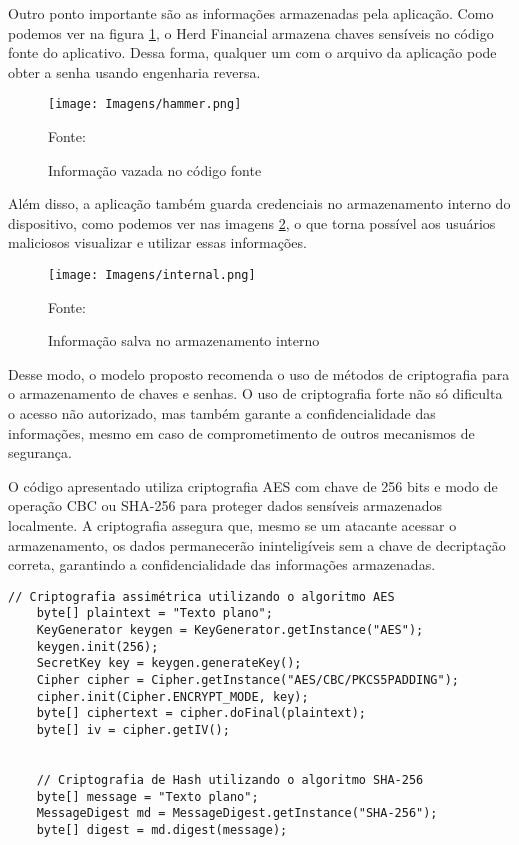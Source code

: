     Outro ponto importante são as informações armazenadas pela aplicação. Como podemos ver na figura \ref{chave}, o Herd Financial armazena chaves sensíveis no código fonte do aplicativo. Dessa forma, qualquer um com o arquivo da aplicação pode obter a senha usando engenharia reversa.

    \begin{figure}[H]
    \centering 
    \texttt{[image: Imagens/hammer.png]} 
    \caption{Informação vazada no código fonte}
    Fonte: 
    \label{chave}
    \end{figure}

    Além disso, a aplicação também guarda credenciais no armazenamento interno do dispositivo, como podemos ver nas imagens \ref{internal}, o que torna possível aos usuários maliciosos visualizar e utilizar essas informações. 
    
    \begin{figure}[H]
    \centering 
    \texttt{[image: Imagens/internal.png]} 
    \caption{Informação salva no armazenamento interno}
    Fonte: 
    \label{internal}
    \end{figure}


    Desse modo, o modelo proposto recomenda o uso de métodos de criptografia para o armazenamento de chaves e senhas. O uso de criptografia forte não só dificulta o acesso não autorizado, mas também garante a confidencialidade das informações, mesmo em caso de comprometimento de outros mecanismos de segurança.

    O código apresentado utiliza criptografia AES com chave de 256 bits e modo de operação CBC ou SHA-256 para proteger dados sensíveis armazenados localmente. A criptografia assegura que, mesmo se um atacante acessar o armazenamento, os dados permanecerão ininteligíveis sem a chave de decriptação correta, garantindo a confidencialidade das informações armazenadas.
    \\

    \begin{scriptsize}
    \estiloJava
    \begin{lstlisting}[caption={Uso de criptografia para armazenamento de dados}, label=lst:javacode]
    // Criptografia assimétrica utilizando o algoritmo AES
    byte[] plaintext = "Texto plano";
    KeyGenerator keygen = KeyGenerator.getInstance("AES");
    keygen.init(256);
    SecretKey key = keygen.generateKey();
    Cipher cipher = Cipher.getInstance("AES/CBC/PKCS5PADDING");
    cipher.init(Cipher.ENCRYPT_MODE, key);
    byte[] ciphertext = cipher.doFinal(plaintext);
    byte[] iv = cipher.getIV();


    // Criptografia de Hash utilizando o algoritmo SHA-256
    byte[] message = "Texto plano";
    MessageDigest md = MessageDigest.getInstance("SHA-256");
    byte[] digest = md.digest(message);
    
    \end{lstlisting}
    \end{scriptsize}

